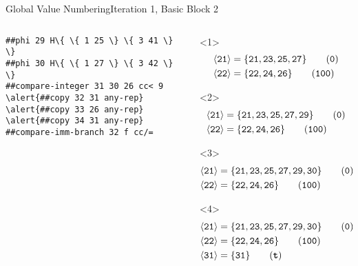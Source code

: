 \documentclass{beamer}
\newcommand{\vn}[1]{\ensuremath{\langle\texttt{#1}\rangle}}
\newcommand{\vreg}[1]{\texttt{#1}}
\begin{document}
\begin{frame}[fragile]{Global Value Numbering}{Iteration 1, Basic Block 2}
\begin{columns}[t,onlytextwidth]
\begin{column}[t]{.5\textwidth}
\begin{onlyenv}
\begin{Verbatim}[frame=single,commandchars=\\\{\}]
##phi 29 H\{ \{ 1 25 \} \{ 3 41 \} \}
##phi 30 H\{ \{ 1 27 \} \{ 3 42 \} \}
##compare-integer 31 30 26 cc< 9
\alert{##copy 32 31 any-rep}
\alert{##copy 33 26 any-rep}
\alert{##copy 34 31 any-rep}
##compare-imm-branch 32 f cc/=
        \end{Verbatim}
      \end{onlyenv}
    \end{column}
    \begin{column}{.5\textwidth}
      \begin{onlyenv}<1>
        \begin{align*}
          \vn{21} &= \{\vreg{21}, \vreg{23}, \vreg{25}, \vreg{27}\} \tag{\texttt{0}}   \\
          \vn{22} &= \{\vreg{22}, \vreg{24}, \vreg{26}\}            \tag{\texttt{100}} \\
        \end{align*}
      \end{onlyenv}
      \begin{onlyenv}<2>
        \begin{align*}
          \vn{21} &= \{\vreg{21}, \vreg{23}, \vreg{25}, \vreg{27}, \vreg{29}\} \tag{\texttt{0}}   \\
          \vn{22} &= \{\vreg{22}, \vreg{24}, \vreg{26}\}            \tag{\texttt{100}} \\
        \end{align*}
      \end{onlyenv}
      \begin{onlyenv}<3>
        \begin{align*}
          \vn{21} &= \{\vreg{21}, \vreg{23}, \vreg{25}, \vreg{27}, \vreg{29}, \vreg{30}\} \tag{\texttt{0}}   \\
          \vn{22} &= \{\vreg{22}, \vreg{24}, \vreg{26}\}            \tag{\texttt{100}} \\
        \end{align*}
      \end{onlyenv}
      \begin{onlyenv}<4>
        \begin{align*}
          \vn{21} &= \{\vreg{21}, \vreg{23}, \vreg{25}, \vreg{27}, \vreg{29}, \vreg{30}\} \tag{\texttt{0}}   \\
          \vn{22} &= \{\vreg{22}, \vreg{24}, \vreg{26}\}            \tag{\texttt{100}} \\
          \vn{31} &= \{\vreg{31}\}                                  \tag{\texttt{\textbf{t}}} \\
        \end{align*}

\end{onlyenv}
\end{column}
\end{columns}
\end{frame}
\end{document}
